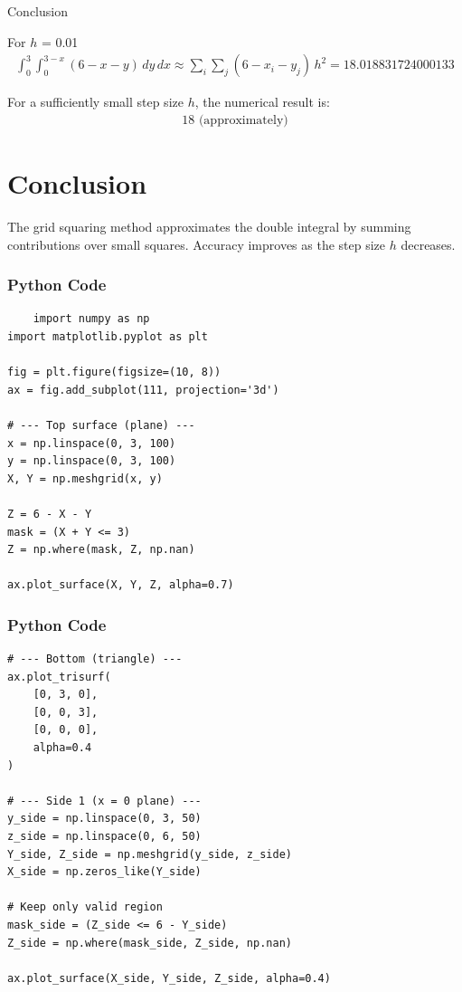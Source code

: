 \documentclass{beamer}
\begin{document}
\begin{frame}{Conclusion}

For $h$ = 0.01
\begin{align}
\int_{0}^{3} \int_{0}^{3-x} (6 - x - y)\, dy\, dx
\approx
\sum_{i} \sum_{j} (6 - x_i - y_j)\, h^2 = 18.018831724000133
\end{align}

For a sufficiently small step size $h$, the numerical result is:
\begin{align}
\boxed{18 \text{ (approximately)}}
\end{align}

\section*{Conclusion}

The grid squaring method approximates the double integral by summing contributions over small squares. 
Accuracy improves as the step size $h$ decreases.

\end{frame}
\begin{frame}[fragile]
\frametitle{Python Code}
\begin{lstlisting}
    import numpy as np
import matplotlib.pyplot as plt

fig = plt.figure(figsize=(10, 8))
ax = fig.add_subplot(111, projection='3d')

# --- Top surface (plane) ---
x = np.linspace(0, 3, 100)
y = np.linspace(0, 3, 100)
X, Y = np.meshgrid(x, y)

Z = 6 - X - Y
mask = (X + Y <= 3)
Z = np.where(mask, Z, np.nan)

ax.plot_surface(X, Y, Z, alpha=0.7)
\end{lstlisting}
\end{frame}
\begin{frame}[fragile]
\frametitle{Python Code}
\begin{lstlisting}
# --- Bottom (triangle) ---
ax.plot_trisurf(
    [0, 3, 0],
    [0, 0, 3],
    [0, 0, 0],
    alpha=0.4
)

# --- Side 1 (x = 0 plane) ---
y_side = np.linspace(0, 3, 50)
z_side = np.linspace(0, 6, 50)
Y_side, Z_side = np.meshgrid(y_side, z_side)
X_side = np.zeros_like(Y_side)

# Keep only valid region
mask_side = (Z_side <= 6 - Y_side)
Z_side = np.where(mask_side, Z_side, np.nan)

ax.plot_surface(X_side, Y_side, Z_side, alpha=0.4)
\end{lstlisting}
\end{frame}
\end{document}
